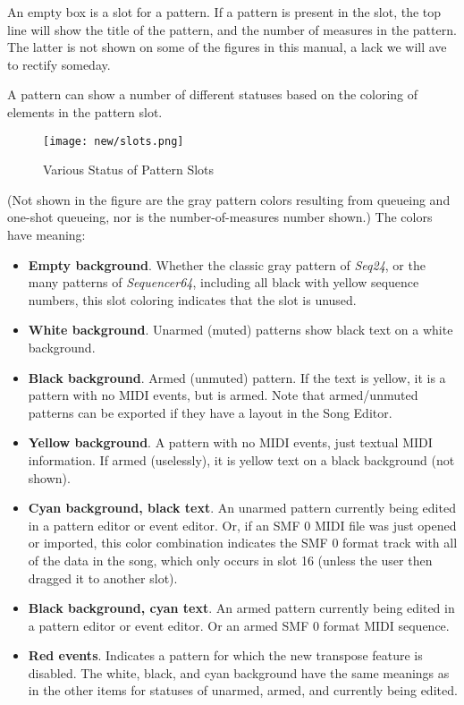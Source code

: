    An empty box is a slot for a pattern.
   If a pattern is present in the slot, the top line will show
   the title of the pattern, and the number of measures in the pattern.
   The latter is not shown on some of the figures in this manual, a
   lack we will ave to rectify someday.

   A pattern can show a number of different statuses based on the coloring
   of elements in the pattern slot. 

\begin{figure}[H]
   \centering 
   \texttt{[image: new/slots.png]}
   \caption{Various Status of Pattern Slots}
   \label{fig:pattern_slots_statuses}
\end{figure}

   (Not shown in the figure are the gray pattern
   colors resulting from queueing and one-shot queueing, nor is the
   number-of-measures number shown.)
   The colors have meaning:

   \begin{itemize}
      \item \textbf{Empty background}.  Whether the classic gray pattern
         of \textsl{Seq24}, or the many patterns of \textsl{Sequencer64},
         including all black with yellow sequence numbers, this
         slot coloring indicates that the slot is unused.
      \item \textbf{White background}.  Unarmed (muted) patterns show black
         text on a white background.
      \item \textbf{Black background}.  Armed (unmuted) pattern.  If the text
         is yellow, it is a pattern with no MIDI events, but is armed.  Note
         that armed/unmuted patterns can be exported if they have a layout in
         the Song Editor.
      \item \textbf{Yellow background}.  A pattern with no MIDI events, just
         textual MIDI information.  If armed (uselessly), it is yellow text on
         a black background (not shown).
      \item \textbf{Cyan background, black text}.
         An unarmed pattern currently being edited in a pattern editor or event
         editor. Or, if an SMF 0 MIDI file was just opened or imported, this
         color combination indicates the SMF 0 format track with all of the
         data in the song, which only occurs in slot 16 (unless the user then
         dragged it to another slot).
      \item \textbf{Black background, cyan text}.
         An armed pattern currently being edited in a pattern editor or event
         editor.  Or an armed SMF 0 format MIDI sequence.
      \item \textbf{Red events}.
         Indicates a pattern for which the new transpose feature is
         disabled.  The white, black, and cyan background have the same
         meanings as in the other items for statuses of unarmed, armed, and
         currently being edited.
   \end{itemize}

